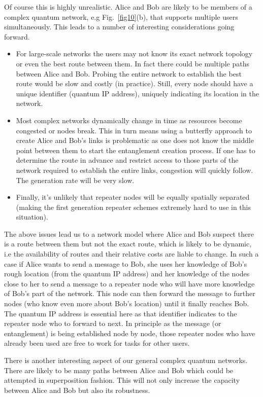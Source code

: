 \documentclass[twocolumn, aps, rmp, amsmath, amssymb, nofootinbib, superscriptaddress, longbibliography, floatfix, table-of-contents, eqsecnum]{revtex4-1}
\begin{document}
Of course this is highly unrealistic. Alice and Bob are likely to be members of a complex quantum network, e.g Fig.~\ref{fig10}(b), that supports multiple users simultaneously. This leads to a number of interesting considerations going forward. 

\begin{itemize}
\item For large-scale networks the users may not know its exact network topology or even the best route between them. In fact there could be multiple paths between Alice and Bob. Probing the entire network to establish the best route would be slow and costly (in practice). Still, every node should have a unique identifier (quantum IP address), uniquely indicating its location in the network.
\item Most complex networks dynamically change in time as resources become congested or nodes break. This in turn means using a butterfly approach to create Alice and Bob's links is problematic as one does not know the middle point between them to start the entanglement creation process. If one has to determine the route in advance and restrict access to those parts of the network required to establish the entire links, congestion will quickly follow. The generation rate will be very slow. 
\item Finally, it's unlikely that repeater nodes will be equally spatially separated (making the first generation repeater schemes extremely hard to use in this situation). 
\end{itemize}

The above issues lead us to a network model where Alice and Bob suspect there is a route between them but not the exact route, which is likely to be dynamic, i.e the availability of routes and their relative costs are liable to change. In such a case if Alice wants to send a message to Bob, she uses her knowledge of Bob's rough location (from the quantum IP address) and her knowledge of the nodes close to her to send a message to a repeater node who will have more knowledge of Bob's part of the network. This node can then forward the message to further nodes (who know even more about Bob's location) until it finally reaches Bob. The quantum IP address is essential here as that identifier indicates to the repeater node who to forward to next. In principle as the message (or entanglement) is being established node by node, those repeater nodes who have already been used are free to work for tasks for other users. 

There is another interesting aspect of our general complex quantum networks. There are likely to be many paths between Alice and Bob which could be attempted in superposition fashion. This will not only increase the capacity between Alice and Bob but also its robustness. 


\end{document}

